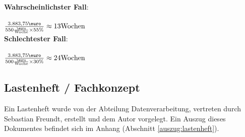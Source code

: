 \textbf{Wahrscheinlichster Fall}:\\
\\
$\frac{3.883,75\text{\euro}}{550\frac{\text{\euro}}{\text{Woche}} \times 55\text{\%}} \approx 13 \text{Wochen}$
\\


\textbf{Schlechtester Fall}:\\
\\
$\frac{3.883,75\text{\euro}}{500\frac{\text{\euro}}{\text{Woche}} \times 30\text{\%}} \approx 24 \text{Wochen}$
\\

\subsection{Lastenheft / Fachkonzept}
Ein Lastenheft wurde von der Abteilung Datenverarbeitung, vertreten durch Sebastian Freundt,
erstellt und dem Autor vorgelegt. Ein Auszug dieses Dokumentes befindet sich im Anhang  (Abschnitt \ref{auszug:lastenheft}).\par

